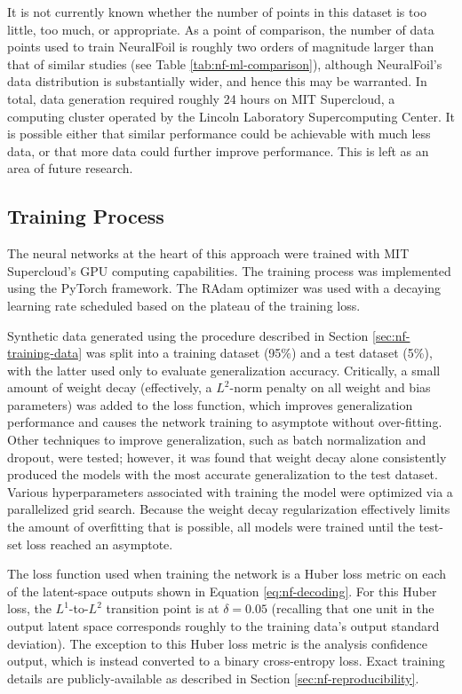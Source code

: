     It is not currently known whether the number of points in this dataset is too little, too much, or appropriate. As a point of comparison, the number of data points used to train NeuralFoil is roughly two orders of magnitude larger than that of similar studies (see Table \ref{tab:nf-ml-comparison}), although NeuralFoil's data distribution is substantially wider, and hence this may be warranted. In total, data generation required roughly 24 hours on MIT Supercloud, a computing cluster operated by the Lincoln Laboratory Supercomputing Center. It is possible either that similar performance could be achievable with much less data, or that more data could further improve performance. This is left as an area of future research.

    \subsection{Training Process}
    \label{sec:nf-training-process}

    The neural networks at the heart of this approach were trained with MIT Supercloud's GPU computing capabilities. The training process was implemented using the PyTorch \cite{paszke_pytorch_2019} framework. The RAdam optimizer \cite{liu_variance_2019} was used with a decaying learning rate scheduled based on the plateau of the training loss.

    Synthetic data generated using the procedure described in Section \ref{sec:nf-training-data} was split into a training dataset (95\%) and a test dataset (5\%), with the latter used only to evaluate generalization accuracy. Critically, a small amount of weight decay (effectively, a $L^2$-norm penalty on all weight and bias parameters) was added to the loss function, which improves generalization performance and causes the network training to asymptote without over-fitting. Other techniques to improve generalization, such as batch normalization and dropout, were tested; however, it was found that weight decay alone consistently produced the models with the most accurate generalization to the test dataset. Various hyperparameters associated with training the model were optimized via a parallelized grid search. Because the weight decay regularization effectively limits the amount of overfitting that is possible, all models were trained until the test-set loss reached an asymptote.

    The loss function used when training the network is a Huber loss metric on each of the latent-space outputs shown in Equation \ref{eq:nf-decoding}. For this Huber loss, the $L^1$-to-$L^2$ transition point is at $\delta=0.05$ (recalling that one unit in the output latent space corresponds roughly to the training data's output standard deviation). The exception to this Huber loss metric is the analysis confidence output, which is instead converted to a binary cross-entropy loss. Exact training details are publicly-available as described in Section \ref{sec:nf-reproducibility}.

